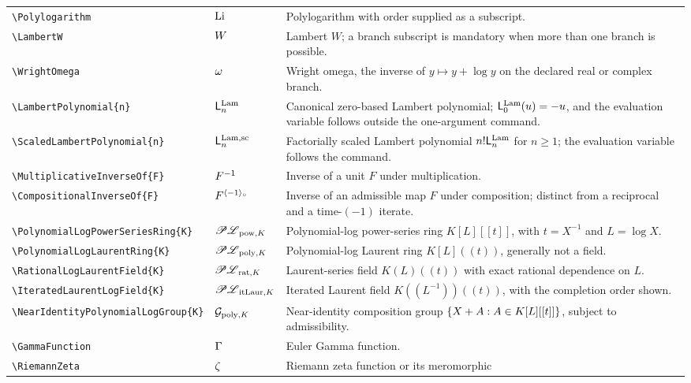 \documentclass[11pt,oneside]{article}
\theoremstyle{definition}
\theoremstyle{remark}
\DeclareRobustCommand{\commandname}[1]{\texttt{\textbackslash#1}}
\begin{document}
\begin{longtable}{@{}S{0.35\textwidth}L{0.14\textwidth}L{0.45\textwidth}@{}}
\commandname{Polylogarithm} & $\operatorname{Li}$ & Polylogarithm with order supplied as a
subscript.\\
\commandname{LambertW} & $W$ & Lambert $W$; a branch subscript is mandatory when
more than one branch is possible.\\
\commandname{WrightOmega} & $\omega$ & Wright omega, the inverse of
\(y\mapsto y+\log y\) on the declared real or complex branch.\\
\commandname{LambertPolynomial}\texttt{\{n\}} &
\(\mathsf{L}^{\mathrm{Lam}}_{n}\) & Canonical zero-based Lambert polynomial;
\(\mathsf{L}^{\mathrm{Lam}}_{0}(u)=-u\), and the evaluation variable follows outside
the one-argument command.\\
\commandname{ScaledLambertPolynomial}\texttt{\{n\}} &
\(\mathsf{L}^{\mathrm{Lam,sc}}_{n}\) & Factorially scaled Lambert polynomial
\(n!\mathsf{L}^{\mathrm{Lam}}_{n}\) for \(n\ge1\); the evaluation variable follows the
command.\\
\commandname{MultiplicativeInverseOf}\texttt{\{F\}} &
\(F^{-1}\) & Inverse of a unit \(F\) under multiplication.\\
\commandname{CompositionalInverseOf}\texttt{\{F\}} &
\(F^{\langle -1\rangle_{\circ}}\) & Inverse of an admissible map \(F\) under
composition; distinct from a reciprocal and a time-\((-1)\) iterate.\\
\commandname{PolynomialLogPowerSeriesRing}\texttt{\{K\}} &
\(\mathscr{PL}_{\mathrm{pow},K}\) & Polynomial-log power-series ring
\(K[L][[t]]\), with \(t=X^{-1}\) and \(L=\log X\).\\
\commandname{PolynomialLogLaurentRing}\texttt{\{K\}} &
\(\mathscr{PL}_{\mathrm{poly},K}\) & Polynomial-log Laurent ring
\(K[L]((t))\), generally not a field.\\
\commandname{RationalLogLaurentField}\texttt{\{K\}} &
\(\mathscr{PL}_{\mathrm{rat},K}\) & Laurent-series field \(K(L)((t))\)
with exact rational dependence on \(L\).\\
\commandname{IteratedLaurentLogField}\texttt{\{K\}} &
\(\mathscr{PL}_{\mathrm{itLaur},K}\) & Iterated Laurent field
\(K((L^{-1}))((t))\), with the completion order shown.\\
\commandname{NearIdentityPolynomialLogGroup}\texttt{\{K\}} &
\(\mathcal{G}_{\mathrm{poly},K}\) & Near-identity composition group
\(\left\{X+A:A\in K[L][[t]]\right\}\), subject to admissibility.\\
\commandname{GammaFunction} & $\Gamma$ & Euler Gamma function.\\
\commandname{RiemannZeta} & $\zeta$ & Riemann zeta function or its meromorphic

\end{longtable}
\end{document}
